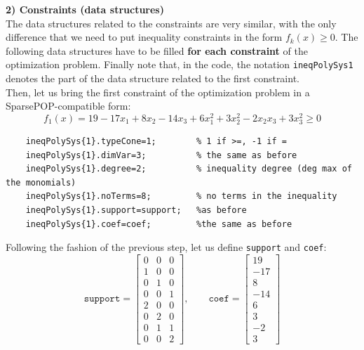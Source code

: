 \noindent
\textbf{\textsf{2) Constraints (data structures)}}\\
The data structures related to the constraints are very similar, with the only difference that we need to put inequality constraints in the form $f_k(x)\ge0$. The following data structures have to be filled \textbf{for each constraint} of the optimization problem. Finally note that, in the code, the notation \texttt{ineqPolySys{1}} denotes the part of the data structure related to the first constraint.\\
Then, let us bring the first constraint of the optimization problem in a SparsePOP-compatible form:
\begin{equation*}
    f_1(x)=19-17x_1+8x_2-14x_3+6x_1^2+3x_2^2-2x_2x_3 +3x_3^2 \ge 0 
\end{equation*}
\begin{verbatim}
    ineqPolySys{1}.typeCone=1;        % 1 if >=, -1 if =
    ineqPolySys{1}.dimVar=3;          % the same as before
    ineqPolySys{1}.degree=2;          % inequality degree (deg max of the monomials)
    ineqPolySys{1}.noTerms=8;         % no terms in the inequality
    ineqPolySys{1}.support=support;   %as before
    ineqPolySys{1}.coef=coef;         %the same as before
\end{verbatim}

\noindent
Following the fashion of the previous step, let us define \texttt{support} and \texttt{coef}: 
\begin{equation*}
    \texttt{support} = \begin{bmatrix}
        0&0&0\\1&0&0\\
        0&1&0\\0&0&1\\
        2&0&0\\0&2&0\\
        0&1&1\\0&0&2
    \end{bmatrix}, \qquad 
    \texttt{coef} = \begin{bmatrix}
        19\\-17\\8\\-14\\
        6\\3\\-2\\3
    \end{bmatrix}
\end{equation*}



